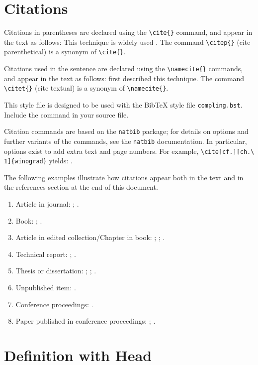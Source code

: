 \documentclass{clv3}
\begin{document}
\section{Citations}
Citations in parentheses are declared using the \verb|\cite{}|
command, and appear in the text as follows:
This technique is widely used \cite{woods}.
The command \verb|\citep{}| (cite parenthetical) is a synonym of \verb|\cite{}|.

Citations used in the sentence are declared using the \verb|\namecite{}|
commands, and appear in the text as follows:
 first described this technique.
The command \verb|\citet{}| (cite textual) is a synonym of \verb|\namecite{}|.

This style file is designed to be used with the BibTeX
style file \verb|compling.bst|.  Include the command
\verb|| in your source file.

Citation commands are based on the \verb|natbib| package;
for details on options and further variants of the commands,
see the \verb|natbib| documentation.  In particular, options
exist to add extra text and page numbers.  For example,
\verb|\cite[cf.][ch.\ 1]{winograd}| yields: \cite[cf.][ch.\ 1]{winograd}.

The following examples illustrate how citations appear both in the text
and in the references section at the end of this document.
\begin{enumerate}
\item Article in journal:
 ;
 .
\item Book:
  ;
  .
\item Article in edited collection/Chapter in book:
  ;
  ;
  .
\item Technical report:
  ;
  .
\item Thesis or dissertation:
  ;
  ;
  .
\item Unpublished item:
  .
\item Conference proceedings:
  .
\item Paper published in conference proceedings:
  ;
  .
\end{enumerate}


\section{Definition with Head}
\end{document}

